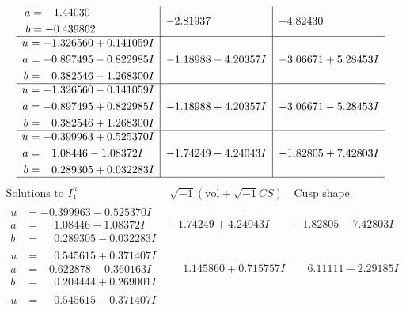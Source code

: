 \documentclass[1p]{elsarticle_modified}
\theoremstyle{definition}
\newcommand{\I}{\sqrt{-1}}
\begin{document}
$$\begin{array}{c|c|c}
\begin{aligned}
a &= \phantom{-}1.44030\phantom{ +0.000000I} \\
b &= -0.439862\phantom{ +0.000000I}\end{aligned}
 & -2.81937\phantom{ +0.000000I} & -4.82430\phantom{ +0.000000I} \\ \hline\begin{aligned}
u &= -1.326560 + 0.141059 I \\
a &= -0.897495 - 0.822985 I \\
b &= \phantom{-}0.382546 - 1.268300 I\end{aligned}
 & -1.18988 - 4.20357 I & -3.06671 + 5.28453 I \\ \hline\begin{aligned}
u &= -1.326560 - 0.141059 I \\
a &= -0.897495 + 0.822985 I \\
b &= \phantom{-}0.382546 + 1.268300 I\end{aligned}
 & -1.18988 + 4.20357 I & -3.06671 - 5.28453 I \\ \hline\begin{aligned}
u &= -0.399963 + 0.525370 I \\
a &= \phantom{-}1.08446 - 1.08372 I \\
b &= \phantom{-}0.289305 + 0.032283 I\end{aligned}
 & -1.74249 - 4.24043 I & -1.82805 + 7.42803 I\\
 \hline 
 \end{array}$$\newpage$$\begin{array}{c|c|c}  
\text{Solutions to }I^u_{1}& \I (\text{vol} + \sqrt{-1}CS) & \text{Cusp shape}\\
 \hline 
\begin{aligned}
u &= -0.399963 - 0.525370 I \\
a &= \phantom{-}1.08446 + 1.08372 I \\
b &= \phantom{-}0.289305 - 0.032283 I\end{aligned}
 & -1.74249 + 4.24043 I & -1.82805 - 7.42803 I \\ \hline\begin{aligned}
u &= \phantom{-}0.545615 + 0.371407 I \\
a &= -0.622878 - 0.360163 I \\
b &= \phantom{-}0.204444 + 0.269001 I\end{aligned}
 & \phantom{-}1.145860 + 0.715757 I & \phantom{-}6.11111 - 2.29185 I \\ \hline\begin{aligned}
u &= \phantom{-}0.545615 - 0.371407 I \\

\end{aligned}
\end{array}$$
\end{document}
